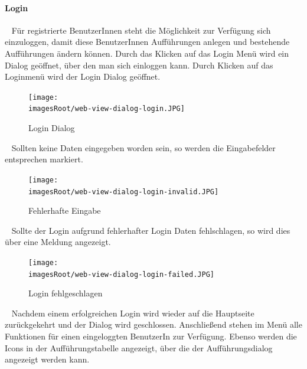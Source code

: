 \documentclass[11pt, a4paper, twoside]{article}   	%
\newcommand{\imagesRoot}{images}
\begin{document}
\paragraph{Login}
\ \newline 
Für registrierte BenutzerInnen steht die Möglichkeit zur Verfügung  sich einzuloggen, damit diese BenutzerInnen Aufführungen anlegen und bestehende Aufführungen ändern können. Durch das Klicken auf das Login Menü wird ein Dialog geöffnet, über den man sich einloggen kann.
Durch Klicken auf das Loginmenü wird der Login Dialog geöffnet.
\begin{figure}[h]
	\centering
	\texttt{[image: \\imagesRoot/web-view-dialog-login.JPG]}
	\caption
	{Login Dialog}
\end{figure}
\ \newline
Sollten keine Daten eingegeben worden sein, so werden die Eingabefelder entsprechen markiert.
\begin{figure}[h]
	\centering
	\texttt{[image: \\imagesRoot/web-view-dialog-login-invalid.JPG]}
	\caption
	{Fehlerhafte Eingabe}
\end{figure}
\ \newline
Sollte der Login aufgrund fehlerhafter Login Daten fehlschlagen, so wird dies über eine Meldung angezeigt.
\begin{figure}[h]
	\centering
	\texttt{[image: \\imagesRoot/web-view-dialog-login-failed.JPG]}
	\caption
	{Login fehlgeschlagen}
\end{figure}
\ \newline
Nachdem einem erfolgreichen Login wird wieder auf die Hauptseite zurückgekehrt und der Dialog wird geschlossen. Anschließend stehen im Menü alle Funktionen für einen eingeloggten BenutzerIn zur Verfügung. Ebenso werden die Icons in der Aufführungstabelle angezeigt, über die der Aufführungsdialog angezeigt werden kann.
\newpage
\end{document}
